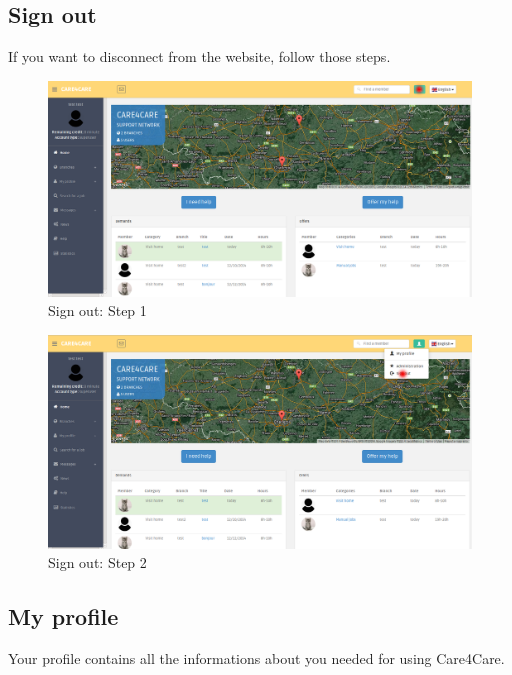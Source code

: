 \documentclass{article}
\begin{document}
\clearpage
\subsection{Sign out}
If you want to disconnect from the website, follow those steps.
\begin{figure}[!ht]
   \includegraphics[width=\textwidth]{img/out1.png}
   \caption{Sign out: Step 1}
\end{figure}
\begin{figure}[!ht]
   \includegraphics[width=\textwidth]{img/out2.png}
   \caption{Sign out: Step 2}
\end{figure}

\clearpage
\subsection{My profile}
Your profile contains all the informations about you needed for using Care4Care.
\end{document}
